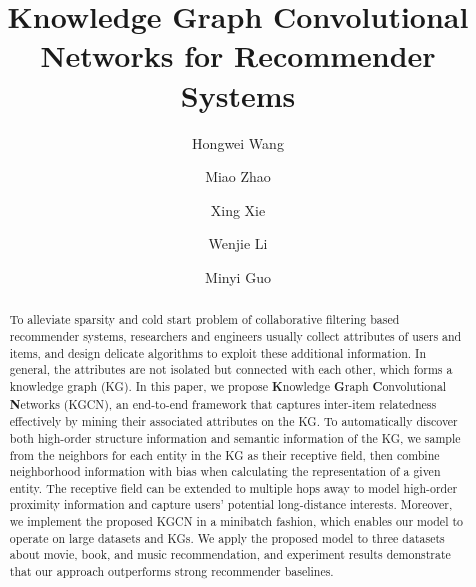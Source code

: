 \documentclass[sigconf]{acmart}
\begin{document}
 
\title{Knowledge Graph Convolutional Networks for Recommender Systems}


\author{Hongwei Wang}

\author{Miao Zhao}

\author{Xing Xie}

\author{Wenjie Li}

\author{Minyi Guo}



\begin{abstract}
	To alleviate sparsity and cold start problem of collaborative filtering based recommender systems, researchers and engineers usually collect attributes of users and items, and design delicate algorithms to exploit these additional information.
	In general, the attributes are not isolated but connected with each other, which forms a knowledge graph (KG).
	In this paper, we propose \textbf{K}nowledge \textbf{G}raph \textbf{C}onvolutional \textbf{N}etworks (KGCN), an end-to-end framework that captures inter-item relatedness effectively by mining their associated attributes on the KG.
	To automatically discover both high-order structure information and semantic information of the KG, we sample from the neighbors for each entity in the KG as their receptive field, then combine neighborhood information with bias when calculating the representation of a given entity.
	The receptive field can be extended to multiple hops away to model high-order proximity information and capture users' potential long-distance interests.
	Moreover, we implement the proposed KGCN in a minibatch fashion, which enables our model to operate on large datasets and KGs.
	We apply the proposed model to three datasets about movie, book, and music recommendation, and experiment results demonstrate that our approach outperforms strong recommender baselines.
\end{abstract}
\end{document}
